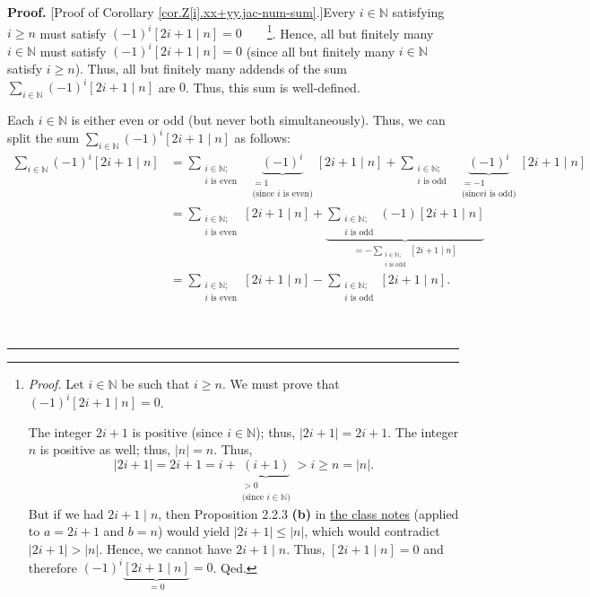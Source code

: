 \documentclass[paper=a4, fontsize=12pt]{scrartcl}%
\let\sumnonlimits\sum
\renewcommand{\sum}{\sumnonlimits\limits}
\theoremstyle{plainsl}
\theoremstyle{definition}
\theoremstyle{remark}
\newenvironment{proof}[1][Proof]{\noindent\textbf{#1.} }{\ \rule{0.5em}{0.5em}}
\begin{document}
\begin{proof}
[Proof of Corollary \ref{cor.Z[i].xx+yy.jac-num-sum}.]Every $i\in\mathbb{N}$
satisfying $i\geq n$ must satisfy $\left(  -1\right)  ^{i}\left[  2i+1\mid
n\right]  =0$\ \ \ \ \footnote{\textit{Proof.} Let $i\in\mathbb{N}$ be such
that $i\geq n$. We must prove that $\left(  -1\right)  ^{i}\left[  2i+1\mid
n\right]  =0$.
\par
The integer $2i+1$ is positive (since $i\in\mathbb{N}$); thus, $\left\vert
2i+1\right\vert =2i+1$. The integer $n$ is positive as well; thus, $\left\vert
n\right\vert =n$. Thus,
\[
\left\vert 2i+1\right\vert =2i+1=i+\underbrace{\left(  i+1\right)
}_{\substack{>0\\\text{(since }i\in\mathbb{N}\text{)}}}>i\geq n=\left\vert
n\right\vert .
\]
But if we had $2i+1\mid n$, then Proposition 2.2.3 \textbf{(b)} in
\href{http://www.cip.ifi.lmu.de/~grinberg/t/19s/notes.pdf}{the class notes}
(applied to $a=2i+1$ and $b=n$) would yield $\left\vert 2i+1\right\vert
\leq\left\vert n\right\vert $, which would contradict $\left\vert
2i+1\right\vert >\left\vert n\right\vert $. Hence, we cannot have $2i+1\mid
n$. Thus, $\left[  2i+1\mid n\right]  =0$ and therefore $\left(  -1\right)
^{i}\underbrace{\left[  2i+1\mid n\right]  }_{=0}=0$. Qed.}. Hence, all but
finitely many $i\in\mathbb{N}$ must satisfy $\left(  -1\right)  ^{i}\left[
2i+1\mid n\right]  =0$ (since all but finitely many $i\in\mathbb{N}$ satisfy
$i\geq n$). Thus, all but finitely many addends of the sum $\sum
_{i\in\mathbb{N}}\left(  -1\right)  ^{i}\left[  2i+1\mid n\right]  $ are $0$.
Thus, this sum is well-defined.

Each $i\in\mathbb{N}$ is either even or odd (but never both simultaneously).
Thus, we can split the sum $\sum_{i\in\mathbb{N}}\left(  -1\right)
^{i}\left[  2i+1\mid n\right]  $ as follows:%
\begin{align}
\sum_{i\in\mathbb{N}}\left(  -1\right)  ^{i}\left[  2i+1\mid n\right]   &
=\sum_{\substack{i\in\mathbb{N};\\i\text{ is even}}}\ \ \underbrace{\left(
-1\right)  ^{i}}_{\substack{=1\\\text{(since }i\text{ is even)}}}\left[
2i+1\mid n\right]  +\sum_{\substack{i\in\mathbb{N};\\i\text{ is odd}%
}}\ \ \underbrace{\left(  -1\right)  ^{i}}_{\substack{=-1\\\text{(since
}i\text{ is odd)}}}\left[  2i+1\mid n\right] \nonumber\\
&  =\sum_{\substack{i\in\mathbb{N};\\i\text{ is even}}}\left[  2i+1\mid
n\right]  +\underbrace{\sum_{\substack{i\in\mathbb{N};\\i\text{ is odd}%
}}\left(  -1\right)  \left[  2i+1\mid n\right]  }_{=-\sum_{\substack{i\in
\mathbb{N};\\i\text{ is odd}}}\left[  2i+1\mid n\right]  }\nonumber\\
&  =\sum_{\substack{i\in\mathbb{N};\\i\text{ is even}}}\left[  2i+1\mid
n\right]  -\sum_{\substack{i\in\mathbb{N};\\i\text{ is odd}}}\left[  2i+1\mid
n\right]  . \label{pf.cor.Z[i].xx+yy.jac-num-sum.2}%
\end{align}



\end{proof}
\end{document}
